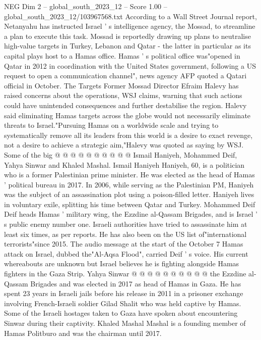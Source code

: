 \begin{textsample}{NEG Dim 2 – global\_south\_2023\_12 – Score 1.00 – global\_south\_2023\_12/103967568.txt}  \label{ex:f2_neg_420}
According to a Wall Street Journal report, Netanyahu has instructed Israel ' s intelligence agency, the Mossad, to streamline a plan to execute this task.
Mossad is reportedly drawing up plans to neutralise high-value targets in Turkey, Lebanon and Qatar - the latter in particular as its capital plays host to a Hamas office.
Hamas ' s political office was"opened in Qatar in 2012 in coordination with the United States government, following a US request to open a communication channel", news agency AFP quoted a Qatari official in October.
The Targets Former Mossad Director Efraim Halevy has raised concerns about the operations, WSJ claims, warning that such actions could have unintended consequences and further destabilise the region.
Halevy said eliminating Hamas targets across the globe would not necessarily eliminate threats to Israel."Pursuing Hamas on a worldwide scale and trying to systematically remove all its leaders from this world is a desire to exact revenge, not a desire to achieve a strategic aim,"Halevy was quoted as saying by WSJ.
Some of the big @ @ @ @ @ @ @ @ @ @ Ismail Haniyeh, Mohammed Deif, Yahya Sinwar and Khaled Mashal.
Ismail Haniyeh Haniyeh, 60, is a politician who is a former Palestinian prime minister.
He was elected as the head of Hamas ' political bureau in 2017.
In 2006, while serving as the Palestinian PM, Haniyeh was the subject of an assassination plot using a poison-filled letter.
Haniyeh lives in voluntary exile, splitting his time between Qatar and Turkey.
Mohammed Deif Deif heads Hamas ' military wing, the Ezzdine al-Qassam Brigades, and is Israel ' s public enemy number one.
Israeli authorities have tried to assassinate him at least six times, as per reports.
He has also been on the US list of"international terrorists"since 2015.
The audio message at the start of the October 7 Hamas attack on Israel, dubbed the"Al-Aqsa Flood", carried Deif ' s voice.
His current whereabouts are unknown but Israel believes he is fighting alongside Hamas fighters in the Gaza Strip.
Yahya Sinwar @ @ @ @ @ @ @ @ @ @ the Ezzdine al-Qassam Brigades and was elected in 2017 as head of Hamas in Gaza.
He has spent 23 years in Israeli jails before his release in 2011 in a prisoner exchange involving French-Israeli soldier Gilad Shalit who was held captive by Hamas.
Some of the Israeli hostages taken to Gaza have spoken about encountering Sinwar during their captivity.
Khaled Mashal Mashal is a founding member of Hamas Politburo and was the chairman until 2017.

\end{textsample}
